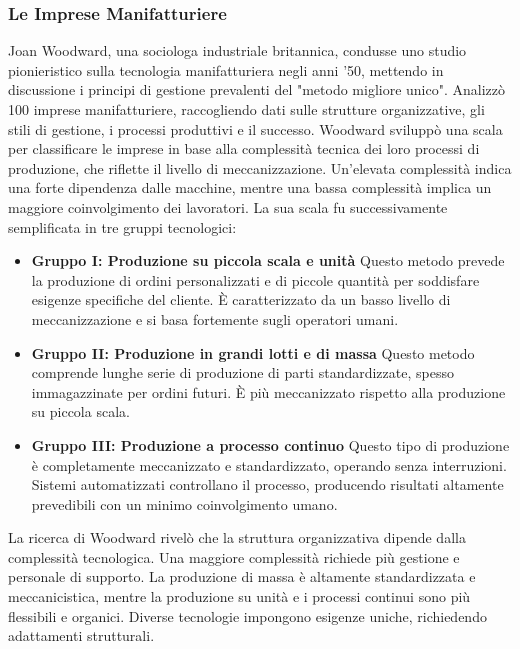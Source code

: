\documentclass{article}
\begin{document}
\subsubsection{Le Imprese Manifatturiere}

Joan Woodward, una sociologa industriale britannica, condusse uno studio pionieristico sulla tecnologia manifatturiera negli anni '50, mettendo in discussione i principi di gestione prevalenti del "metodo migliore unico". Analizz\`o 100 imprese manifatturiere, raccogliendo dati sulle strutture organizzative, gli stili di gestione, i processi produttivi e il successo. Woodward svilupp\`o una scala per classificare le imprese in base alla complessit\`a tecnica dei loro processi di produzione, che riflette il livello di meccanizzazione. Un'elevata complessit\`a indica una forte dipendenza dalle macchine, mentre una bassa complessit\`a implica un maggiore coinvolgimento dei lavoratori. La sua scala fu successivamente semplificata in tre gruppi tecnologici:

\begin{itemize}
    \item \textbf{Gruppo I: Produzione su piccola scala e unit\`a} \newline
    Questo metodo prevede la produzione di ordini personalizzati e di piccole quantit\`a per soddisfare esigenze specifiche del cliente. \`E caratterizzato da un basso livello di meccanizzazione e si basa fortemente sugli operatori umani.
    
    \item \textbf{Gruppo II: Produzione in grandi lotti e di massa} \newline
    Questo metodo comprende lunghe serie di produzione di parti standardizzate, spesso immagazzinate per ordini futuri. \`E pi\`u meccanizzato rispetto alla produzione su piccola scala.
    
    \item \textbf{Gruppo III: Produzione a processo continuo} \newline
    Questo tipo di produzione \`e completamente meccanizzato e standardizzato, operando senza interruzioni. Sistemi automatizzati controllano il processo, producendo risultati altamente prevedibili con un minimo coinvolgimento umano.
\end{itemize}

La ricerca di Woodward rivel\`o che la struttura organizzativa dipende dalla complessit\`a tecnologica. Una maggiore complessit\`a richiede pi\`u gestione e personale di supporto. La produzione di massa \`e altamente standardizzata e meccanicistica, mentre la produzione su unit\`a e i processi continui sono pi\`u flessibili e organici. Diverse tecnologie impongono esigenze uniche, richiedendo adattamenti strutturali.
\end{document}
